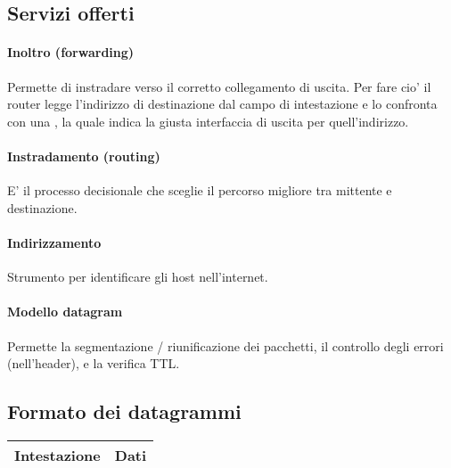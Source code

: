 \subsection{Servizi offerti}
\paragraph{Inoltro (forwarding)}
Permette di instradare verso il corretto collegamento di uscita.
Per fare cio' il router legge l'indirizzo di destinazione dal campo di intestazione e lo confronta con una , la quale indica la giusta interfaccia di uscita per quell'indirizzo.
\paragraph{Instradamento (routing)}
E' il processo decisionale che sceglie il percorso migliore tra mittente e destinazione.
\paragraph{Indirizzamento}
Strumento per identificare gli host nell'internet.
\paragraph{Modello datagram} Permette la segmentazione / riunificazione dei pacchetti, il controllo degli errori (nell'header), e la verifica TTL.
\subsection{Formato dei datagrammi}
\begin{center}
    \begin{tabular}{|c|c|}
        \hline
        Intestazione&\hspace{15mm}Dati\hspace{15mm}\space\\
        \hline
    \end{tabular}
\end{center}
